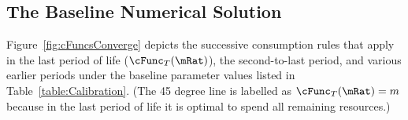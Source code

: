 \documentclass[BufferStockTheory]{subfiles}
\begin{document}

\hypertarget{Baseline-Numerical-Solution}{}
\subsection{The Baseline Numerical Solution}

Figure~\ref{fig:cFuncsConverge} depicts the successive consumption
rules that apply in the last period of life ($\cFunc_{T}(\mRat)$), the
second-to-last period, and various earlier periods under the
baseline parameter values listed in Table~\ref{table:Calibration}.
(The 45 degree line is labelled as $\cFunc_{T}(\mRat) = m$ because in
the last period of life it is optimal to spend all remaining
resources.)

\hypertarget{Calibration}{}


\end{document}
